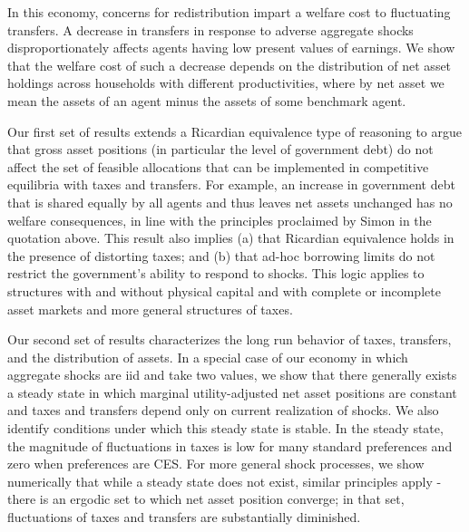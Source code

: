 \documentclass[thmsb,11pt]{article}
\begin{document}
In this economy, concerns for redistribution impart a welfare cost to fluctuating transfers. A decrease in transfers in response to adverse aggregate shocks disproportionately affects agents having low present values of earnings. We show that the welfare cost of such a decrease depends on the distribution of net asset holdings across households with different productivities, where by  net asset we mean the assets of an agent minus the assets of some benchmark agent.

Our first set of results extends a Ricardian equivalence type of reasoning to argue that gross asset positions (in particular the level of government debt) do not affect the set of feasible allocations that can be implemented in competitive equilibria with taxes and transfers. For example, an increase in government debt that is shared equally by all agents and thus leaves net assets unchanged  has no welfare consequences, in line with the principles proclaimed by Simon \citet{newcomb1865critical} %
 in the quotation above. This result also implies (a) that Ricardian
equivalence holds in the presence of
distorting  taxes; and (b) that ad-hoc borrowing limits do not restrict the government's ability to respond to shocks.
This logic applies to structures with and without physical
capital and with complete or incomplete asset markets and more general structures of taxes.



Our second set of results characterizes the long run behavior of taxes, transfers, and the distribution of assets. In a special case of our economy in which aggregate shocks are iid and take two values, we show that  there generally exists a steady state in which marginal utility-adjusted net asset positions are constant and taxes and transfers depend only on current realization of shocks. We also identify conditions under which this steady state is stable. In the steady state, the magnitude of fluctuations in taxes is low for many standard preferences and zero when preferences are CES. For more general shock processes, we show numerically that while a steady state does not exist, similar principles apply - there is an ergodic set to which net asset position converge; in that set, fluctuations of taxes and transfers are substantially diminished.
\end{document}
